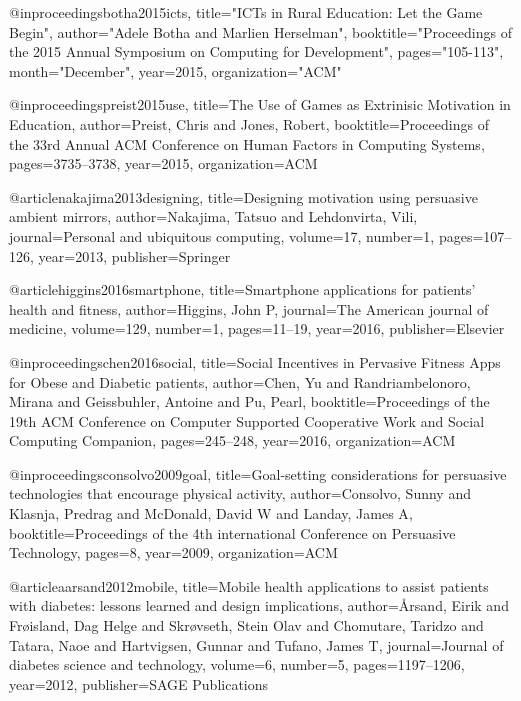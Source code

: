 @inproceedings{botha2015icts,
  title="ICTs in Rural Education: Let the Game Begin",
  author="Adele Botha and Marlien Herselman",
  booktitle="Proceedings of the 2015 Annual Symposium on Computing for Development",
  pages="105-113",
  month="December",
  year={2015},
  organization="ACM"
}

@inproceedings{preist2015use,
  title={The Use of Games as Extrinisic Motivation in Education},
  author={Preist, Chris and Jones, Robert},
  booktitle={Proceedings of the 33rd Annual ACM Conference on Human Factors in Computing Systems},
  pages={3735--3738},
  year={2015},
  organization={ACM}
}

@article{nakajima2013designing,
  title={Designing motivation using persuasive ambient mirrors},
  author={Nakajima, Tatsuo and Lehdonvirta, Vili},
  journal={Personal and ubiquitous computing},
  volume={17},
  number={1},
  pages={107--126},
  year={2013},
  publisher={Springer}
}

@article{higgins2016smartphone,
  title={Smartphone applications for patients' health and fitness},
  author={Higgins, John P},
  journal={The American journal of medicine},
  volume={129},
  number={1},
  pages={11--19},
  year={2016},
  publisher={Elsevier}
}


@inproceedings{chen2016social,
  title={Social Incentives in Pervasive Fitness Apps for Obese and Diabetic patients},
  author={Chen, Yu and Randriambelonoro, Mirana and Geissbuhler, Antoine and Pu, Pearl},
  booktitle={Proceedings of the 19th ACM Conference on Computer Supported Cooperative Work and Social Computing Companion},
  pages={245--248},
  year={2016},
  organization={ACM}
}


@inproceedings{consolvo2009goal,
  title={Goal-setting considerations for persuasive technologies that encourage physical activity},
  author={Consolvo, Sunny and Klasnja, Predrag and McDonald, David W and Landay, James A},
  booktitle={Proceedings of the 4th international Conference on Persuasive Technology},
  pages={8},
  year={2009},
  organization={ACM}
}


@article{aarsand2012mobile,
  title={Mobile health applications to assist patients with diabetes: lessons learned and design implications},
  author={{\AA}rsand, Eirik and Fr{\o}island, Dag Helge and Skr{\o}vseth, Stein Olav and Chomutare, Taridzo and Tatara, Naoe and Hartvigsen, Gunnar and Tufano, James T},
  journal={Journal of diabetes science and technology},
  volume={6},
  number={5},
  pages={1197--1206},
  year={2012},
  publisher={SAGE Publications}
}


